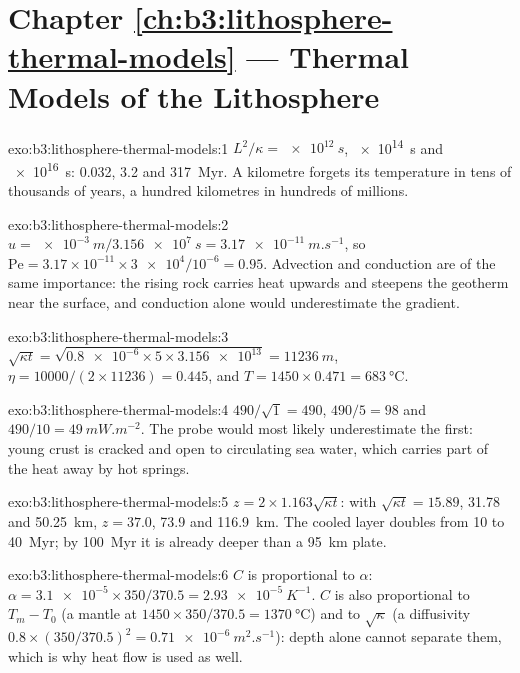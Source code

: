 \section*{Chapter \ref{ch:b3:lithosphere-thermal-models} --- Thermal Models of the Lithosphere}

\begin{solution}{exo:b3:lithosphere-thermal-models:1}
$L^2/\kappa = \qty{e12}{s}$, \qty{e14}{s} and \qty{e16}{s}: 0.032, 3.2 and
\qty{317}{Myr}. A kilometre forgets its temperature in tens of thousands of
years, a hundred kilometres in hundreds of millions.
\end{solution}

\begin{solution}{exo:b3:lithosphere-thermal-models:2}
$u = \qty{e-3}{m}/\qty{3.156e7}{s} = \qty{3.17e-11}{m.s^{-1}}$, so
$\mathrm{Pe} = 3.17\times10^{-11}\times\num{3e4}/10^{-6} = 0.95$. Advection and
conduction are of the same importance: the rising rock carries heat upwards
and steepens the geotherm near the surface, and conduction alone would
underestimate the gradient.
\end{solution}

\begin{solution}{exo:b3:lithosphere-thermal-models:3}
$\sqrt{\kappa t} = \sqrt{\num{0.8e-6}\times5\times\num{3.156e13}} =
\qty{11236}{m}$, $\eta = 10000/(2\times11236) = 0.445$, and $T = 1450\times0.471
= \qty{683}{\celsius}$.
\end{solution}

\begin{solution}{exo:b3:lithosphere-thermal-models:4}
$490/\sqrt1 = 490$, $490/5 = 98$ and $490/10 = \qty{49}{mW.m^{-2}}$. The probe
would most likely underestimate the first: young crust is cracked and open to
circulating sea water, which carries part of the heat away by hot springs.
\end{solution}

\begin{solution}{exo:b3:lithosphere-thermal-models:5}
$z = 2\times1.163\sqrt{\kappa t}$: with $\sqrt{\kappa t} = 15.89$, 31.78 and
\qty{50.25}{km}, $z = 37.0$, 73.9 and \qty{116.9}{km}. The cooled layer doubles
from 10 to \qty{40}{Myr}; by \qty{100}{Myr} it is already deeper than a
\qty{95}{km} plate.
\end{solution}

\begin{solution}{exo:b3:lithosphere-thermal-models:6}
$C$ is proportional to $\alpha$: $\alpha = \num{3.1e-5}\times350/370.5 =
\qty{2.93e-5}{K^{-1}}$. $C$ is also proportional to $T_m - T_0$ (a mantle at
$1450\times350/370.5 = \qty{1370}{\celsius}$) and to $\sqrt\kappa$ (a
diffusivity $0.8\times(350/370.5)^2 = \qty{0.71e-6}{m^2.s^{-1}}$): depth alone
cannot separate them, which is why heat flow is used as well.
\end{solution}

